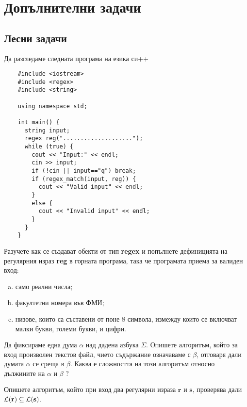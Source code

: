 \section{Допълнителни задачи}

\subsection{Лесни задачи}

\ifcode
\begin{problem}
  Да разгледаме следната програма на езика си++
  \begin{verbatim}
    #include <iostream>
    #include <regex>
    #include <string>
    
    using namespace std;
    
    int main() {
      string input;
      regex reg("....................");
      while (true) {
        cout << "Input:" << endl;
        cin >> input;
        if (!cin || input=="q") break;
        if (regex_match(input, reg)) {
          cout << "Valid input" << endl;
        }  
        else {
          cout << "Invalid input" << endl;
        }
      }
    }
  \end{verbatim}
  Разучете как се създават обекти от тип {\bf regex} и попълнете дефиницията на регулярния израз {\bf reg} в горната програма, така че програмата приема за валиден вход:
  \begin{enumerate}[a)]
  \item 
    само реални числа;
  \item
    факултетни номера във ФМИ;
  \item
    низове, които са съставени от поне 8 символа, измежду които се включват малки букви, големи букви,
    и цифри.    
  \end{enumerate}
\end{problem}
\fi

\begin{problem}
  Да фиксираме една дума $\alpha$ над дадена азбука $\Sigma$.
  Опишете алгоритъм, който за вход произволен текстов файл, чието съдържание означаваме с $\beta$,
  отговаря дали думата $\alpha$ се среща в $\beta$.
  Каква е сложността на този алгоритъм относно дължините на $\alpha$ и $\beta$ ?
\end{problem}

\begin{problem}
  Опишете алгоритъм, който при вход два регулярни израза $\mathbf{r}$ и $\mathbf{s}$,
  проверява дали $\mathcal{L}(\mathbf{r}) \subseteq \mathcal{L}(\mathbf{s})$.
\end{problem}


